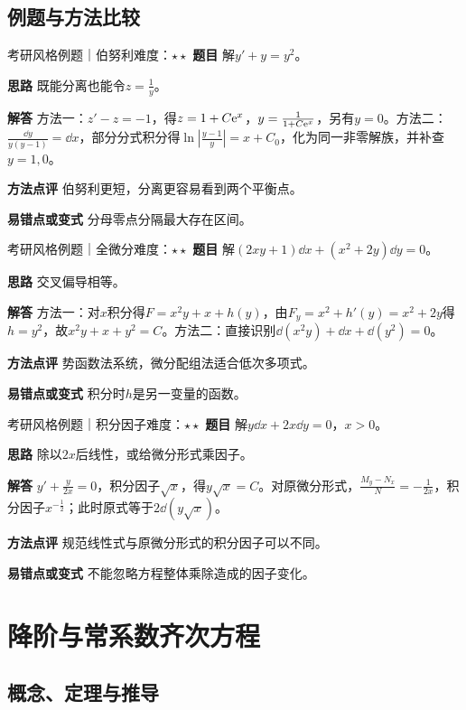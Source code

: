 \subsection{例题与方法比较}
\begin{example}{考研风格例题｜伯努利}{难度：$\star\star$}
\label{ex:4:4}\textbf{题目} 解$y\prime+y=y^2$。\par
\textbf{思路} 既能分离也能令$z=\frac{1}{y}$。\par
\textbf{解答} 方法一：$z\prime-z=-1$，得$z=1+C\mathrm{e}^x$，$y=\frac{1}{1+C\mathrm{e}^x}$，另有$y=0$。方法二：$\frac{\dd y}{y(y-1)}=\dd x$，部分分式积分得$\ln|\frac{y-1}{y}|=x+C_0$，化为同一非零解族，并补查$y=1,0$。\par
\textbf{方法点评} 伯努利更短，分离更容易看到两个平衡点。\par
\textbf{易错点或变式} 分母零点分隔最大存在区间。
\end{example}
\begin{example}{考研风格例题｜全微分}{难度：$\star\star$}
\label{ex:4:5}\textbf{题目} 解$(2xy+1)\dd x+(x^2+2y)\dd y=0$。\par
\textbf{思路} 交叉偏导相等。\par
\textbf{解答} 方法一：对$x$积分得$F=x^2y+x+h(y)$，由$F_y=x^2+h\prime(y)=x^2+2y$得$h=y^2$，故$x^2y+x+y^2=C$。方法二：直接识别$\dd(x^2y)+\dd x+\dd(y^2)=0$。\par
\textbf{方法点评} 势函数法系统，微分配组法适合低次多项式。\par
\textbf{易错点或变式} 积分时$h$是另一变量的函数。
\end{example}
\begin{example}{考研风格例题｜积分因子}{难度：$\star\star$}
\label{ex:4:6}\textbf{题目} 解$y\dd x+2x\dd y=0$，$x>0$。\par
\textbf{思路} 除以$2x$后线性，或给微分形式乘因子。\par
\textbf{解答} $y\prime+\frac{y}{2x}=0$，积分因子$\sqrt x$，得$y\sqrt x=C$。对原微分形式，$\frac{M_y-N_x}{N}=-\frac{1}{2x}$，积分因子$x^{-\frac{1}{2}}$；此时原式等于$2\dd(y\sqrt x)$。\par
\textbf{方法点评} 规范线性式与原微分形式的积分因子可以不同。\par
\textbf{易错点或变式} 不能忽略方程整体乘除造成的因子变化。
\end{example}
\section{降阶与常系数齐次方程}\label{sec:4:3}
\subsection{概念、定理与推导}

